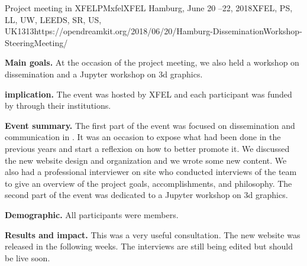 \begin{event}{Project meeting in XFEL}{PMxfel}{XFEL Hamburg, June 20 --22, 2018}{XFEL, PS, LL, UW, LEEDS, SR, US, UK}{13}{13}{https://opendreamkit.org/2018/06/20/Hamburg-DisseminationWorkshop-SteeringMeeting/}

\textbf{Main goals.} At the occasion of the project meeting, we also held a workshop on dissemination and a Jupyter workshop on 3d graphics.

\textbf{\ODK implication.} The event was hosted by XFEL and each participant was funded by \ODK through their institutions.

\textbf{Event summary.} The first part of the event was focused on dissemination and communication in \ODK. It was an occasion to expose what had been done in the previous years and start a reflexion on how to better promote it. We discussed the new website design and organization and we wrote some new content. We also had a professional interviewer on site who conducted interviews of the \ODK team to give an overview of the project goals, accomplishments, and philosophy. The second part of the event was dedicated to a Jupyter workshop on 3d graphics.

\textbf{Demographic.} All participants were \ODK members.

\textbf{Results and impact.} This was a very useful consultation. The new website was released in the following weeks. The interviews are still being edited but should be live soon.


\end{event}
